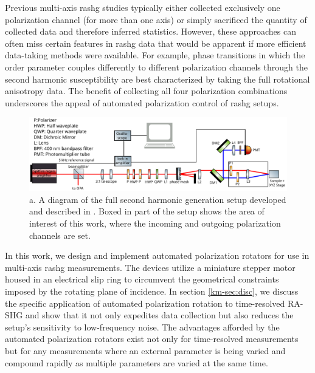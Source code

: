 Previous multi-axis \gls{rashg} studies typically either collected exclusively one polarization channel \citep{Shan2021GiantEngineering} (for more than one axis) or simply sacrificed the quantity of collected data and therefore inferred statistics. 
However, these approaches can often miss certain features in \gls{rashg} data that would be apparent if more efficient data-taking methods were available.
For example, phase transitions in which the order parameter couples differently to different polarization channels through the second harmonic susceptibility \citep{Fichera2023Light-inducedSemiconductor} are best characterized by taking the full rotational anisotropy data.
The benefit of collecting all four polarization combinations underscores the appeal of automated polarization control of \gls{rashg} setups.

\begin{figure}
\centering
\includegraphics[width=\textwidth]{gfx/ch4/km-fig2.pdf}
\caption[A diagram of the full second harmonic generation setup]{a. A diagram of the full second harmonic generation setup developed and described in \citet{Fichera2020SecondSymmetry}.
Boxed in part of the setup shows the area of interest of this work, where the incoming and outgoing polarization channels are set.}
\label{km-fig:2}
\end{figure}

In this work, we design and implement automated polarization rotators for use in multi-axis \gls{rashg} measurements. 
The devices utilize a miniature stepper motor housed in an electrical slip ring to circumvent the geometrical constraints imposed by the rotating plane of incidence.
In section \ref{km-sec:disc}, we discuss the specific application of automated polarization rotation to time-resolved RA-SHG and show that it not only expedites data collection but also reduces the setup's sensitivity to low-frequency noise. 
The advantages afforded by the automated polarization rotators exist not only for time-resolved measurements but for any measurements where an external parameter is being varied and compound rapidly as multiple parameters are varied at the same time.

